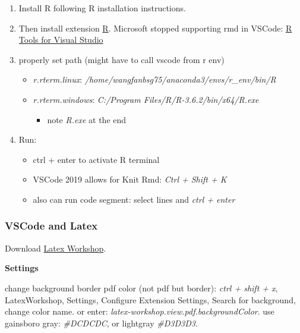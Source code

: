 \documentclass[]{article}
\providecommand{\tightlist}{%
  \setlength{\itemsep}{0pt}\setlength{\parskip}{0pt}}
\begin{document}
\begin{enumerate}
\def\labelenumi{\arabic{enumi}.}
\tightlist
\item
  Install R following R installation instructions.
\item
  Then install extension
  \href{https://marketplace.visualstudio.com/items?itemName=Ikuyadeu.r}{R}.
  Microsoft stopped supporting rmd in VSCode:
  \href{https://github.com/microsoft/RTVS}{R Tools for Visual Studio}
\item
  properly set path (might have to call vscode from r env)

  \begin{itemize}
  \tightlist
  \item
    \emph{r.rterm.linux}:
    \emph{/home/wangfanbsg75/anaconda3/envs/r\_env/bin/R}
  \item
    \emph{r.rterm.windows}: \emph{C:/Program
    Files/R/R-3.6.2/bin/x64/R.exe}

    \begin{itemize}
    \tightlist
    \item
      note \emph{R.exe} at the end
    \end{itemize}
  \end{itemize}
\item
  Run:

  \begin{itemize}
  \tightlist
  \item
    ctrl + enter to activate R terminal
  \item
    VSCode 2019 allows for Knit Rmd: \emph{Ctrl + Shift + K}
  \item
    also can run code segment: select lines and \emph{ctrl + enter}
  \end{itemize}
\end{enumerate}

\hypertarget{vscode-and-latex}{%
\subsubsection{VSCode and Latex}\label{vscode-and-latex}}

Download
\href{https://marketplace.visualstudio.com/items?itemName=James-Yu.latex-workshop}{Latex
Workshop}.

\textbf{Settings}

change background border pdf color (not pdf but border): \emph{ctrl +
shift + x}, LatexWorkshop, Settings, Configure Extension Settings,
Search for background, change color name. or enter:
\emph{latex-workshop.view.pdf.backgroundColor}. use gainsboro gray:
\emph{\#DCDCDC}, or lightgray \emph{\#D3D3D3}.
\end{document}
